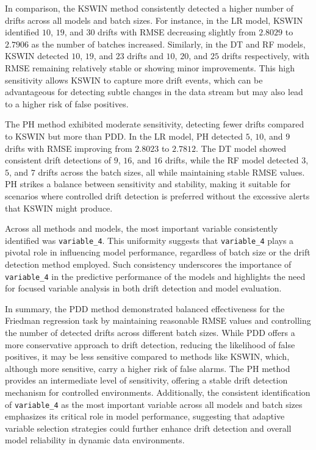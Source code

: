 \documentclass[pdflatex,sn-mathphys-ay]{sn-jnl}%
\theoremstyle{thmstyleone}%
\theoremstyle{thmstyletwo}%
\theoremstyle{thmstylethree}%
\begin{document}
In comparison, the KSWIN method consistently detected a higher number of drifts across all models and batch sizes. For instance, in the LR model, KSWIN identified $10$, $19$, and $30$ drifts with RMSE decreasing slightly from $2.8029$ to $2.7906$ as the number of batches increased. Similarly, in the DT and RF models, KSWIN detected $10$, $19$, and $23$ drifts and $10$, $20$, and $25$ drifts respectively, with RMSE remaining relatively stable or showing minor improvements. This high sensitivity allows KSWIN to capture more drift events, which can be advantageous for detecting subtle changes in the data stream but may also lead to a higher risk of false positives.

The PH method exhibited moderate sensitivity, detecting fewer drifts compared to KSWIN but more than PDD. In the LR model, PH detected $5$, $10$, and $9$ drifts with RMSE improving from $2.8023$ to $2.7812$. The DT model showed consistent drift detections of $9$, $16$, and $16$ drifts, while the RF model detected $3$, $5$, and $7$ drifts across the batch sizes, all while maintaining stable RMSE values. PH strikes a balance between sensitivity and stability, making it suitable for scenarios where controlled drift detection is preferred without the excessive alerts that KSWIN might produce.

Across all methods and models, the most important variable consistently identified was \texttt{variable\_4}. This uniformity suggests that \texttt{variable\_4} plays a pivotal role in influencing model performance, regardless of batch size or the drift detection method employed. Such consistency underscores the importance of \texttt{variable\_4} in the predictive performance of the models and highlights the need for focused variable analysis in both drift detection and model evaluation.

In summary, the PDD method demonstrated balanced effectiveness for the Friedman regression task by maintaining reasonable RMSE values and controlling the number of detected drifts across different batch sizes. While PDD offers a more conservative approach to drift detection, reducing the likelihood of false positives, it may be less sensitive compared to methods like KSWIN, which, although more sensitive, carry a higher risk of false alarms. The PH method provides an intermediate level of sensitivity, offering a stable drift detection mechanism for controlled environments. Additionally, the consistent identification of \texttt{variable\_4} as the most important variable across all models and batch sizes emphasizes its critical role in model performance, suggesting that adaptive variable selection strategies could further enhance drift detection and overall model reliability in dynamic data environments.
\end{document}
